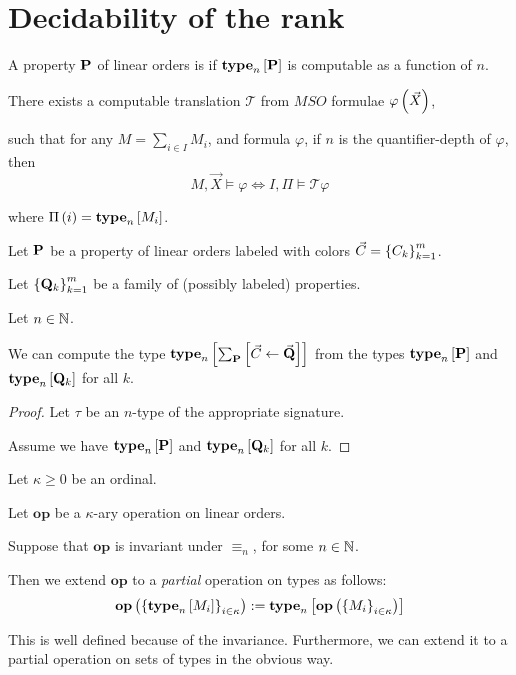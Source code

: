 \section{Decidability of the rank}
\begin{definition}
  A property $\mathbf{P}$ of linear orders is if
  $\mathbf{type}_{n} \left[ {\mathbf{P}} \right]$ is computable as a function of $n$.
\end{definition}    

\begin{theorem}
  There exists a computable translation $\mathcal{T}$
  from $MSO$ formulae $\varphi \left( {\vec{X}} \right)$,

  such that for any $M = \sum_{i \in I} M_i$, and formula $\varphi$,
  if $n$ is the quantifier-depth of $\varphi$,
  then
  \[
    M, \vec{X} \models \varphi \iff I, \Pi \models \mathcal{T} {\varphi}
  \]

  where $\Pi \left( {i} \right) = \mathbf{type}_{n} \left[ {M_i} \right]$.
\end{theorem}

\begin{corollary}
  Let $\mathbf{P}$ be a property of linear orders
  labeled with colors $\vec{C} = \left\{ {C_k} \right\}_{k=1}^m$.

  Let $\left\{ {\mathbf{Q}_k} \right\}_{k=1}^m$ be a family of (possibly labeled) properties.

  Let $n \in \mathbb{N}$.

  We can compute the type $\mathbf{type}_{n} \left[ {\sum_{\mathbf{P}} \left[ {{\vec{C}} \leftarrow {\vec{\mathbf{Q}}}} \right]} \right]$
  from the types $\mathbf{type}_{n} \left[ {\mathbf{P}} \right]$ and $\mathbf{type}_{n} \left[ {\mathbf{Q}_k} \right]$ for all $k$.
\end{corollary}

\begin{proof}
  Let $\tau$ be an $n$-type of the appropriate signature.
  
  Assume we have $\mathbf{type}_{n} \left[ {\mathbf{P}} \right]$ and $\mathbf{type}_{n} \left[ {\mathbf{Q}_k} \right]$ for all $k$.
\end{proof}

\begin{definition}
  Let $\kappa \ge 0$ be an ordinal.

  Let $\mathbf{op}$ be a $\kappa$-ary operation on linear orders.

  Suppose that $\mathbf{op}$ is invariant under $\equiv_n$, for some $n \in \mathbb{N}$.

  Then we extend $\mathbf{op}$ to a \emph{partial} operation on types as follows:
  \[
    \mathbf{op} \left( { \left\{ {\mathbf{type}_{n} \left[ {M_i} \right]} \right\}_{i \in \kappa} } \right)
    := \mathbf{type}_{n} \left[ {\mathbf{op} \left( {\left\{ {M_i} \right\}_{i \in \kappa}} \right)} \right]
  \]

  This is well defined because of the invariance. Furthermore, we can
  extend it to a partial operation on sets of types in the obvious way.
\end{definition}

